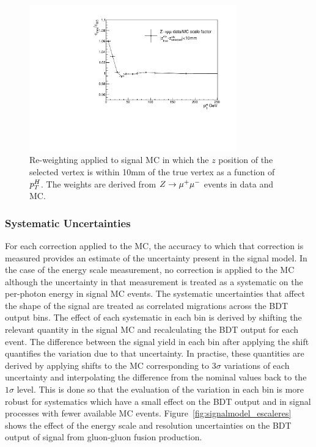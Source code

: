 \begin{figure}
\includegraphics[width=0.8\textwidth]{hgg7TeV/generalPlots/vtxReweight.pdf}
\caption{Re-weighting applied to signal MC in which the $z$ position of the selected vertex 
is within 10mm of the true vertex as a function of $p_{T}^{H}$. The weights are derived from $Z\rightarrow \mu^{+}\mu^{-}$ events
 in data and MC.}
\label{fig:vtxprobreweight}
\end{figure}

\subsubsection{Systematic Uncertainties}

For each correction applied to the MC, the accuracy to which that correction
is measured provides an estimate of the uncertainty present in the signal model. 
In the case of the energy scale measurement, no correction is applied to the MC although the 
uncertainty in that measurement is treated as a systematic on the per-photon energy in signal MC events.
The systematic uncertainties that affect the shape of the signal are treated as correlated  
migrations across the BDT output bins. The effect of each systematic in each
bin is derived by shifting the relevant quantity in the signal MC and recalculating the BDT output for each event.
The difference between the signal yield in each bin after applying the shift quantifies the variation due to that uncertainty.
In practise, these quantities are derived by applying shifts to the MC corresponding to $3\sigma$ variations 
of each uncertainty and interpolating the difference from the nominal values back to the $1\sigma$ level.
This is done so that the evaluation of the variation in each bin is more robust for systematics which 
have a small effect on the BDT output and in signal processes with fewer available MC events.
Figure~\ref{fig:signalmodel_escaleres} shows the effect of the energy scale and resolution uncertainties
on the BDT output of signal from gluon-gluon fusion production.

